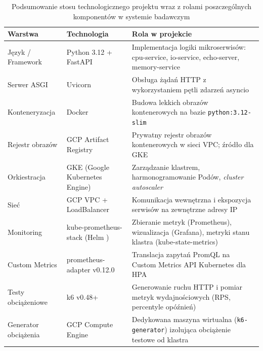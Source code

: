 \begin{table}[H]
  \centering
  \begin{tabularx}{\textwidth}{|l|X|X|}
    \hline
    \textbf{Warstwa} & \textbf{Technologia} & \textbf{Rola w projekcie} \\
    \hline
    Język / Framework & Python 3.12 + FastAPI \cite{fastapi} & Implementacja logiki mikroserwisów: cpu-service, io-service, echo-server, memory-service \\
    Serwer ASGI & Uvicorn & Obsługa żądań HTTP z wykorzystaniem pętli zdarzeń asyncio \\
    Konteneryzacja & Docker \cite{docker2023} & Budowa lekkich obrazów kontenerowych na bazie \texttt{python:3.12-slim} \\
    Rejestr obrazów & GCP Artifact Registry \cite{gcp-artifact-registry} & Prywatny rejestr obrazów kontenerowych w sieci VPC; źródło dla GKE \\
    Orkiestracja & GKE (Google Kubernetes Engine) \cite{gke-docs} & Zarządzanie klastrem, harmonogramowanie Podów, \textit{cluster autoscaler} \\
    Sieć & GCP VPC + LoadBalancer \cite{gcp-lb-docs} & Komunikacja wewnętrzna i ekspozycja serwisów na zewnętrzne adresy IP \\
    Monitoring & kube-prometheus-stack \cite{kube-prometheus-stack} (Helm \cite{helm-docs}) & Zbieranie metryk (Prometheus), wizualizacja (Grafana), metryki stanu klastra (kube-state-metrics) \\
    Custom Metrics & prometheus-adapter v0.12.0 \cite{prometheus-adapter} & Translacja zapytań PromQL na Custom Metrics API Kubernetes dla HPA \\
    Testy obciążeniowe & k6 v0.48+ \cite{k6-docs} & Generowanie ruchu HTTP i pomiar metryk wydajnościowych (RPS, percentyle opóźnień) \\
    Generator obciążenia & GCP Compute Engine \cite{gce-docs} & Dedykowana maszyna wirtualna (\texttt{k6-generator}) izolująca obciążenie testowe od klastra \\
    \hline
  \end{tabularx}
  \caption{Podsumowanie stosu technologicznego projektu wraz z rolami poszczególnych komponentów w systemie badawczym}
  \label{tab:tech-stack}
\end{table}
